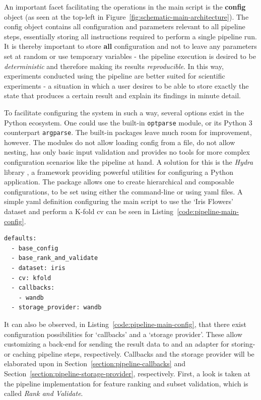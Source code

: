 \documentclass[../main.tex]{subfiles}
\begin{document}
An important facet facilitating the operations in the main script is the \textbf{config} object (as seen at the top-left in Figure~\ref{fig:schematic-main-architecture}). The config object contains all configuration and parameters relevant to all pipeline steps, essentially storing all instructions required to perform a single pipeline run. It is thereby important to store \textbf{all} configuration and not to leave any parameters set at random or use temporary variables - the pipeline execution is desired to be \textit{deterministic} and therefore making its results \textit{reproducible}. In this way, experiments conducted using the pipeline are better suited for scientific experiments - a situation in which a user desires to be able to store exactly the state that produces a certain result and explain its findings in minute detail.

To facilitate configuring the system in such a way, several options exist in the Python ecosystem. One could use the built-in \texttt{optparse} module, or its Python 3 counterpart \texttt{argparse}. The built-in packages leave much room for improvement, however. The modules do not allow loading config from a file, do not allow nesting, has only basic input validation and provides no tools for more complex configuration scenarios like the pipeline at hand. A solution for this is the \textit{Hydra} library \citep{yadan_hydra_2019}, a framework providing powerful utilities for configuring a Python application. The package allows one to create hierarchical and composable configurations, to be set using either the command-line or using yaml files. A simple yaml definition configuring the main script to use the `Iris Flowers' dataset and perform a K-fold \gls{cv} can be seen in Listing~\ref{code:pipeline-main-config}.

\begin{lstlisting}[caption={A simple configuration for the main script, using the `Iris Flowers' dataset and K-fold \gls{cv}.}, label={code:pipeline-main-config}]
defaults:
  - base_config
  - base_rank_and_validate
  - dataset: iris
  - cv: kfold
  - callbacks:
    - wandb
  - storage_provider: wandb
\end{lstlisting}

It can also be observed, in Listing~\ref{code:pipeline-main-config}, that there exist configuration possibilities for `callbacks' and a `storage provider'. These allow customizing a back-end for sending the result data to and an adapter for storing- or caching pipeline steps, respectively. Callbacks and the storage provider will be elaborated upon in Section~\ref{section:pipeline-callbacks} and Section~\ref{section:pipeline-storage-provider}, respectively. First, a look is taken at the pipeline implementation for feature ranking and subset validation, which is called \textit{Rank and Validate}.
\end{document}
